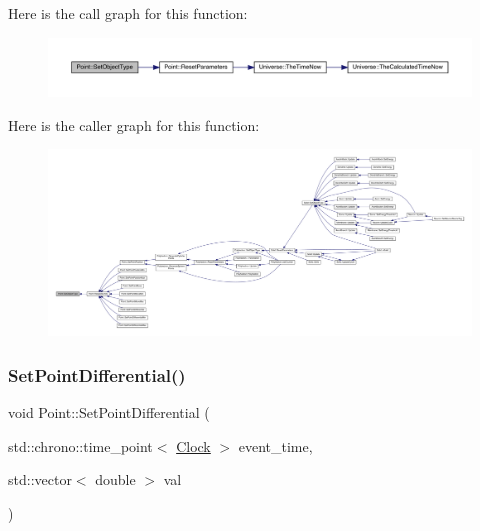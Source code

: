 Here is the call graph for this function\+:
\nopagebreak
\begin{figure}[H]
\begin{center}
\leavevmode
\includegraphics[width=350pt]{class_point_a3afeb2d7a2e2b7d9406a57fefa1af2ee_cgraph}
\end{center}
\end{figure}
Here is the caller graph for this function\+:
\nopagebreak
\begin{figure}[H]
\begin{center}
\leavevmode
\includegraphics[width=350pt]{class_point_a3afeb2d7a2e2b7d9406a57fefa1af2ee_icgraph}
\end{center}
\end{figure}
\mbox{\label{class_point_adb977a2f01e7a2b549e1bd36fa6f5354}} 
\subsubsection{\texorpdfstring{Set\+Point\+Differential()}{SetPointDifferential()}}
{\footnotesize\ttfamily void Point\+::\+Set\+Point\+Differential (\begin{DoxyParamCaption}\item[{std\+::chrono\+::time\+\_\+point$<$ \hyperlink{universe_8h_a0ef8d951d1ca5ab3cfaf7ab4c7a6fd80}{Clock} $>$}]{event\+\_\+time,  }\item[{std\+::vector$<$ double $>$}]{val }\end{DoxyParamCaption})\hspace{0.3cm}{\ttfamily [inline]}}



